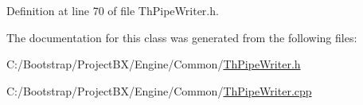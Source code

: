 Definition at line 70 of file ThPipeWriter.h.

The documentation for this class was generated from the following files:\begin{CompactItemize}
\item 
C:/Bootstrap/ProjectBX/Engine/Common/\hyperlink{_th_pipe_writer_8h}{ThPipeWriter.h}\item 
C:/Bootstrap/ProjectBX/Engine/Common/\hyperlink{_th_pipe_writer_8cpp}{ThPipeWriter.cpp}\end{CompactItemize}
